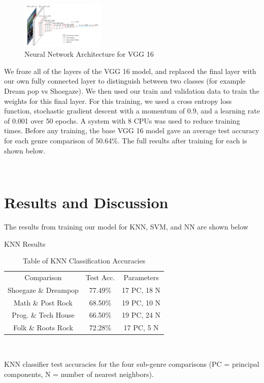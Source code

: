 \documentclass[letterpaper, 12 pt, conference]{ieeeconf}  %
\begin{document}
\begin{figure}
\begin{center}
    \includegraphics[width=4cm]{VGG16acc.png}
\caption{Neural Network Architecture for VGG 16}
\end{center}
\end{figure}


We froze all of the layers of the VGG 16 model, and replaced the final layer with our own fully connected layer to distinguish between two classes (for example Dream pop vs Shoegaze). We then used our train and validation data to train the weights for this final layer. For this training, we used a cross entropy loss function, stochastic gradient descent with a momentum of 0.9, and a learning rate of 0.001 over 50 epochs. A system with 8 CPUs was used to reduce training times. Before any training, the base VGG 16 model gave an average test accuracy for each genre comparison of 50.64\%. The full results after training for each is shown below.


\newline \,\,


\section{Results and Discussion}

The results from training our model for KNN, SVM, and NN are shown below
\newline \,\,

\par KNN Results

\begin{table}[!hb]
    \begin{center}
    \caption{Table of KNN Classification Accuracies}{\label{tab:knn_acc}}
    \begin{tabular}{ |c|c|c| }
      Comparison & Test Acc. & Parameters \\ 
      Shoegaze \& Dreampop & 77.49\% & 17 PC, 18 N\\
      Math \& Post Rock & 68.50\% & 19 PC, 10 N\\
      Prog. \& Tech House & 66.50\% & 19 PC, 24 N\\
      Folk \& Roots Rock & 72.28\% & 17 PC, 5 N\\
     
    \end{tabular}\\
    \end{center}
    KNN classifier test accuracies for the four sub-genre comparisons (PC = principal components, N = number of nearest neighbors). 
\end{table}
\end{document}
